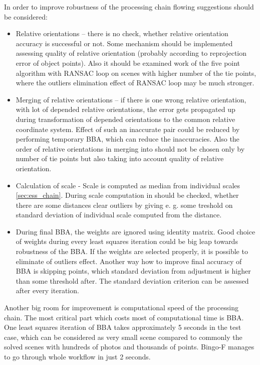 \documentclass[a4paper,12pt]{article}
\begin{document}
In order to improve robustness of the processing chain flowing suggestions should be considered:
\begin{itemize}
\item Relative orientations -- there is no check, whether relative orientation accuracy is successful or not. Some mechanism 
should be implemented assessing quality of relative orientation (probably according to reprojection error of object points).
Also it should be examined work of the five point algorithm with RANSAC loop on scenes with higher number of the tie points, where 
the outliers elimination effect of RANSAC loop may be much stronger.
\item  Merging of relative orientations -- if there is one wrong relative orientation, with lot of depended relative orientations,
the error gets propagated up during transformation of depended orientations to the common relative coordinate system. 
Effect of such an inaccurate pair could be 
reduced by performing  temporary BBA, which can reduce the inaccuracies. Also the order of relative orientations in merging 
into  should not 
be chosen only by number of tie points but also taking into account quality of relative orientation.
\item Calculation of scale - Scale is computed as median from individual scales \ref{sec:ess_chain}.
During scale computation in should be checked, whether there are some distances clear
outliers by giving e. g. some treshold on standard deviation of individual scale computed 
from the distance.



\item During final BBA, the weights are ignored using identity matrix. Good choice of weights during every least squares iteration 
could be big leap towards robustness of the BBA. If the weights are selected properly, it is possible to eliminate of outliers 
effect.
Another way how to improve final accuracy of BBA is skipping points, which 
standard deviation from adjustment is higher than some threshold after. The standard deviation criterion can be assessed 
after every iteration.
\end{itemize}


Another big room for improvement is computational speed of the processing chain.
The most critical part which costs most of computational time is BBA.
One least squares  iteration of BBA takes approximately 5 seconds in the test case, which can be 
considered as very small scene compared to commonly the solved
scenes with hundreds of photos and thousands of points. Bingo-F manages to go through whole workflow in just 2 seconds.
\end{document}
